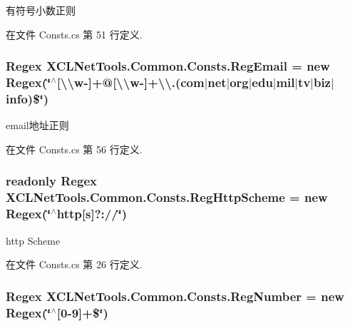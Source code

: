 有符号小数正则 



在文件 Consts.\-cs 第 51 行定义.

\hypertarget{class_x_c_l_net_tools_1_1_common_1_1_consts_a5a55d66840fa9e259ea63d77ae6b3d88}{
\subsubsection[{Reg\-Email}]{\setlength{\rightskip}{0pt plus 5cm}Regex X\-C\-L\-Net\-Tools.\-Common.\-Consts.\-Reg\-Email = new Regex(\char`\"{}$^\wedge$\mbox{[}\textbackslash{}\textbackslash{}w-\/\mbox{]}+@\mbox{[}\textbackslash{}\textbackslash{}w-\/\mbox{]}+\textbackslash{}\textbackslash{}.(com$|$net$|$org$|$edu$|$mil$|$tv$|$biz$|$info)\$\char`\"{})\hspace{0.3cm}{\ttfamily [static]}}}\label{class_x_c_l_net_tools_1_1_common_1_1_consts_a5a55d66840fa9e259ea63d77ae6b3d88}


email地址正则 



在文件 Consts.\-cs 第 56 行定义.

\hypertarget{class_x_c_l_net_tools_1_1_common_1_1_consts_a86f2f516b20b37531db1c7bffea20087}{
\subsubsection[{Reg\-Http\-Scheme}]{\setlength{\rightskip}{0pt plus 5cm}readonly Regex X\-C\-L\-Net\-Tools.\-Common.\-Consts.\-Reg\-Http\-Scheme = new Regex(\char`\"{}$^\wedge$http\mbox{[}s\mbox{]}?\-://\char`\"{})\hspace{0.3cm}{\ttfamily [static]}}}\label{class_x_c_l_net_tools_1_1_common_1_1_consts_a86f2f516b20b37531db1c7bffea20087}


http Scheme 



在文件 Consts.\-cs 第 26 行定义.

\hypertarget{class_x_c_l_net_tools_1_1_common_1_1_consts_a77b7430f7b6be306f3168d8f954803ec}{
\subsubsection[{Reg\-Number}]{\setlength{\rightskip}{0pt plus 5cm}Regex X\-C\-L\-Net\-Tools.\-Common.\-Consts.\-Reg\-Number = new Regex(\char`\"{}$^\wedge$\mbox{[}0-\/9\mbox{]}+\$\char`\"{})\hspace{0.3cm}{\ttfamily [static]}}}\label{class_x_c_l_net_tools_1_1_common_1_1_consts_a77b7430f7b6be306f3168d8f954803ec}



